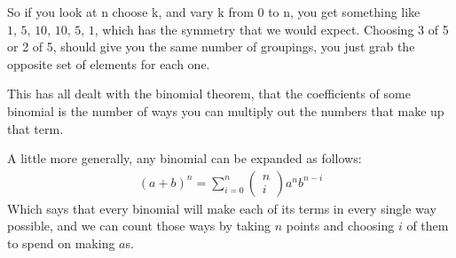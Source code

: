 \documentclass{article}
\begin{document}
    So if you look at n choose k, and vary k from 0 to n, you get something like $1,\,5,\, 10, \,10, \, 5, \,1$, which has the symmetry that we would expect.
    Choosing 3 of 5 or 2 of 5, should give you the same number of groupings, you just grab the opposite set of elements for each one.

    This has all dealt with the binomial theorem, that the coefficients of some binomial is the number of ways you can multiply out the numbers that make up that term.

    A little more generally, any binomial can be expanded as follows:
    \begin{gather*}
        (a+b)^n = \sum_{i=0}^n \left(
            \begin{matrix}
            n\\
            i
        \end{matrix}\right)
         a^nb^{n-i}
    \end{gather*}
    Which says that every binomial will make each of its terms in every single way possible, and we can count those ways by taking $n$ points and choosing $i$ of them to spend on making $a$s.
\end{document}
